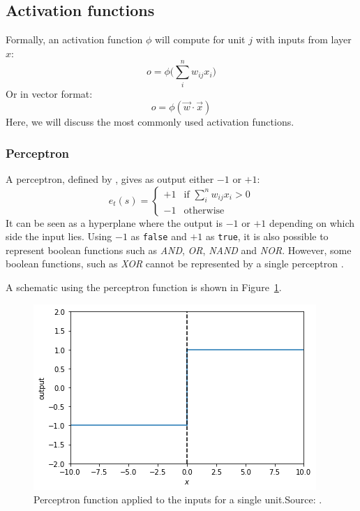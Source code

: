\subsection{Activation functions} %
\label{sub:activation_functions}
Formally, an activation function $\phi$ will compute for unit $j$ with inputs from layer $x$:
\begin{equation}
    o = \phi\big(\sum_i^n w_{ij} x_i\big)
\end{equation}
Or in vector format:
\begin{equation}
    o = \phi(\overrightarrow{w} \cdot \overrightarrow{x})
\end{equation}
Here, we will discuss the most commonly used activation functions.
\subsubsection{Perceptron} %
\label{ssub:perceptron}
A perceptron, defined by \cite{Rosenblatt58}, gives as output either $-1$ or $+1$:
\begin{equation}
e_t(s) = \begin{cases}
+1 & \text{if $\sum_i^n w_{ij} x_i > 0$}\\
-1 & \text{otherwise}
\end{cases}
\end{equation}
It can be seen as a hyperplane where the output is $-1$ or $+1$ depending on which side the input lies.
Using $-1$ as \texttt{false} and $+1$ as \texttt{true}, it is also possible to represent boolean functions such as \textit{AND}, \textit{OR}, \textit{NAND} and \textit{NOR}. However, some boolean functions, such as \textit{XOR} cannot be represented by a single perceptron \citep{ML}.

A schematic using the perceptron function is shown in Figure~\ref{fig:perceptron}.\\
\begin{figure}[htb]
    \centering
    \includegraphics[width=\linewidth]{images/activation_functions/perceptron.png}
    \caption[Perceptron function applied to the inputs for a single unit]{Perceptron function applied to the inputs for a single unit.Source: \cite{Taspinar2016}.}
    \label{fig:perceptron}
\end{figure}

